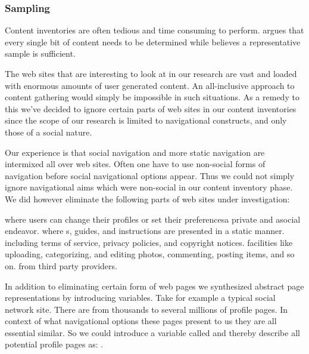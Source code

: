 \subsubsection{Sampling}
\label{section:methodology.content.analysis.sampling}

Content inventories are often tedious and time consuming to perform.
\citet[]{wodtke02} argues that every single bit of content needs to be
determined while \citet[]{morville06} believes a representative sample
is sufficient.

The web sites that are interesting to look at in our research are vast and
loaded with enormous amounts of user generated content. An all-inclusive
approach to content gathering would simply be impossible in such situations.
As a remedy to this we've decided to ignore certain parts of web sites in our
content inventories since the scope of our research is limited to navigational
constructs, and only those of a social nature.

Our experience is that social navigation and more static navigation are
intermixed all over web sites. Often one have to use non-social forms of
navigation before social navigational options appear. Thus we could not simply
ignore navigational aims which were non-social in our content inventory phase.
We did however eliminate the following parts of web sites under investigation:

\begin{enum}
   where users can change their profiles or set
    their preferences\dash{}a private and asocial endeavor.
   where s, guides, and instructions are presented
    in a static manner.
   including terms of service, privacy policies, and
    copyright notices.
   facilities like uploading, categorizing, and
    editing photos, commenting, posting items, and so on.%
   from third party providers.
\end{enum}

In addition to eliminating certain form of web pages we synthesized abstract
page representations by introducing variables. Take for example a typical
social network site. There are from thousands to several millions of
profile pages. In context of what navigational options these pages present to
us they are all essential similar. So we could introduce a variable called
%
and thereby describe all potential profile pages as:
.

